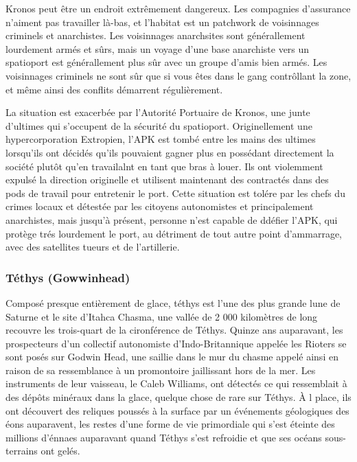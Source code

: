                                                                      Kronos peut être un endroit extrêmement dangereux. Les compagnies d'assurance n'aiment pas travailler là-bas, et l'habitat est un patchwork de voisinnages criminels et anarchistes. Les voisinnages anarchsites sont générallement lourdement armés et sûrs, mais un voyage d'une base anarchiste vers un spatioport est générallement plus sûr avec un groupe d'amis bien armés. Les voisinnages criminels ne sont sûr que si vous êtes dans le gang contrôllant la zone, et même ainsi des conflits démarrent régulièrement. 

                                                                     La situation est exacerbée par l'Autorité Portuaire de Kronos, une junte d'ultimes qui s'occupent de la sécurité du spatioport. Originellement une hypercorporation Extropien, l'APK est tombé entre les mains des ultimes lorsqu'ils ont décidés qu'ils pouvaient gagner plus en possédant directement la société plutôt qu'en travailalnt en tant que bras à louer. Ils ont violemment expulsé la direction originelle et utilisent maintenant des contractés dans des pods de travail pour entretenir le port. Cette situation est tolére par les chefs du crimes locaux et détestée par les citoyens autonomistes et principalement anarchistes, mais jusqu'à présent, personne n'est capable de ddéfier l'APK, qui protège trés lourdement le port, au détriment de tout autre point d'ammarrage, avec des satellites tueurs et de l'artillerie. 

                                                                     \subsubsection{Téthys (Gowwinhead)} \label{sec:tethys-gowwinhead} 

                                                                     Composé presque entièrement de glace, téthys est l'une des plus grande lune de Saturne et le site d'Itahca Chasma, une vallée de 2 000 kilomètres de long recouvre les trois-quart de la cironférence de Téthys. Quinze ans auparavant, les prospecteurs d'un collectif autonomiste d'Indo-Britannique appelée les Rioters se sont posés sur Godwin Head, une saillie dans le mur du chasme appelé ainsi en raison de sa ressemblance à un promontoire jaillissant hors de la mer. Les instruments de leur vaisseau, le Caleb Williams, ont détectés ce qui ressemblait à des dépôts minéraux dans la glace, quelque chose de rare sur Téthys. À l place, ils ont découvert des reliques poussés à la surface par un événements géologiques des éons auparavent, les restes d'une forme de vie primordiale qui s'est éteinte des millions d'énnaes auparavant quand Téthys s'est refroidie et que ses océans sous-terrains ont gelés. 

